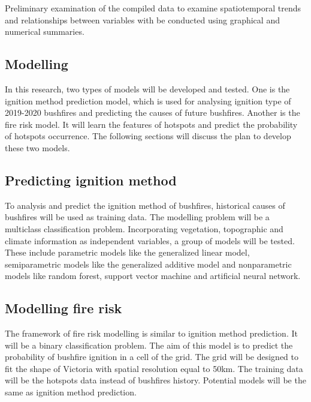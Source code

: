 \documentclass[11pt,a4paper,]{article}
\begin{document}
Preliminary examination of the compiled data to examine spatiotemporal trends and relationships between variables with be conducted using graphical and numerical summaries.

\hypertarget{modelling}{%
\subsection{Modelling}\label{modelling}}

In this research, two types of models will be developed and tested. One is the ignition method prediction model, which is used for analysing ignition type of 2019-2020 bushfires and predicting the causes of future bushfires. Another is the fire risk model. It will learn the features of hotspots and predict the probability of hotspots occurrence. The following sections will discuss the plan to develop these two models.

\hypertarget{predicting-ignition-method}{%
\subsection{Predicting ignition method}\label{predicting-ignition-method}}

To analysis and predict the ignition method of bushfires, historical causes of bushfires will be used as training data. The modelling problem will be a multiclass classification problem. Incorporating vegetation, topographic and climate information as independent variables, a group of models will be tested. These include parametric models like the generalized linear model, semiparametric models like the generalized additive model and nonparametric models like random forest, support vector machine and artificial neural network.

\hypertarget{modelling-fire-risk}{%
\subsection{Modelling fire risk}\label{modelling-fire-risk}}

The framework of fire risk modelling is similar to ignition method prediction. It will be a binary classification problem. The aim of this model is to predict the probability of bushfire ignition in a cell of the grid. The grid will be designed to fit the shape of Victoria with spatial resolution equal to 50km. The training data will be the hotspots data instead of bushfires history. Potential models will be the same as ignition method prediction.
\end{document}
